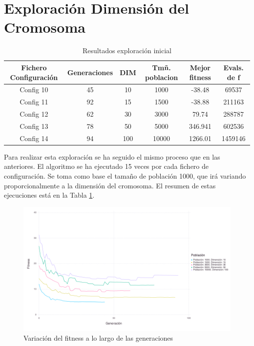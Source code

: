 \section{Exploración Dimensión del Cromosoma}

\begin{table}[]
    \centering
    \begin{tabular}{||c|c|c|c|c|c||}
        \hline
        \textbf{Fichero Configuración} & \textbf{Generaciones} & \textbf{DIM} & \textbf{Tmñ. poblacion} & \textbf{Mejor fitness} & \textbf{Evals. de f}\\ \hline
        Config 10  & 45   & 10    & 1000   & -38.48    &  69537    \\ \hline
        Config 11  & 92   & 15    & 1500   & -38.88    &  211163   \\ \hline
        Config 12  & 62   & 30    & 3000   & 79.74     &  288787   \\ \hline
        Config 13  & 78   & 50    & 5000   & 346.941   &  602536   \\ \hline
        Config 14  & 94   & 100   & 10000  & 1266.01   &  1459146  \\ \hline
    \end{tabular}
    \caption{Resultados exploración inicial}
    \label{tab:exploracion_dim_cromosoma}
\end{table}

Para realizar esta exploración se ha seguido el mismo proceso que en las anteriores. El algoritmo se ha ejecutado 15 veces por cada fichero de configuración.
Se toma como base el tamaño de población 1000, que irá variando proporcionalmente a la dimensión del cromosoma. El resumen de estas ejecuciones está en la 
Tabla \ref{tab:exploracion_dim_cromosoma}. 

\begin{figure}[]
	\centering	
	\includegraphics[scale=0.5]{figuras/ps_cd_variation.png}
	\caption{ Variación del fitness a lo largo de las generaciones }
    \label{fig:exec_summary}
\end{figure}

